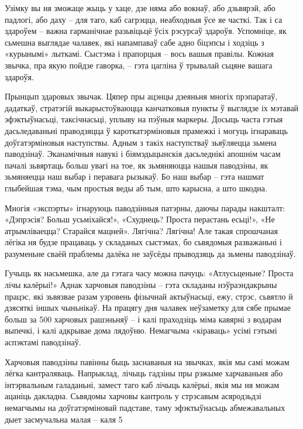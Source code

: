 Узімку вы ня зможаце жыць у хаце, дзе няма або вокнаў, або дзьвярэй, або падлогі, або даху – для таго, каб сагрэцца, неабходныя ўсе яе часткі. Так і са здароўем – важна гарманічнае разьвіцьцё ўсіх рэсурсаў здароўя. Успомніце, як сьмешна выглядае чалавек, які напампаваў сабе адно біцэпсы і ходзіць з «курынымі» лыткамі. Сыстэма і прапорцыя – вось вашыя правілы. Кожная звычка, пра якую пойдзе гаворка, – гэта цагліна ў трывалай сьцяне вашага здароўя.

Прынцып здаровых звычак. Цяпер пры ацэнцы дзеяньня многіх прэпаратаў, дадаткаў, стратэгій выкарыстоўваюцца канчатковыя пункты ў выглядзе іх мэтавай эфэктыўнасьці, таксічнасьці, уплыву на пэўныя маркеры. Досыць часта гэтыя дасьледаваньні праводзяцца ў кароткатэрміновыя прамежкі і могуць ігнараваць доўгатэрміновыя наступствы. Адным з такіх наступстваў зьяўляецца зьмена паводзінаў. Эканамічныя навукі і біямэдыцынскія дасьледнікі апошнім часам пачалі зьвяртаць больш увагі на тое, як зьмяняюцца нашыя паводзіны, як зьмяняецца наш выбар і перавага рызыкаў. Бо наш выбар – гэта нашмат глыбейшая тэма, чым простыя веды аб тым, што карысна, а што шкодна.

Многія «экспэрты» ігнаруюць паводзінныя патэрны, даючы парады накшталт: «Дэпрэсія? Больш усьміхайся!», «Схуднець? Проста перастань есьці!», «Не атрымліваецца? Старайся мацней». Лягічна? Лягічна! Але такая спрошчаная лёгіка ня будзе працаваць у складаных сыстэмах, бо сьвядомыя разважаньні і разуменьне сваёй праблемы далёка не заўсёды прыводзяць да зьмены паводзінаў.

Гучыць як насьмешка, але да гэтага часу можна пачуць: «Атлусьценьне? Проста лічы калёрыі!» Аднак харчовыя паводзіны – гэта складаны нэўраэндакрыны працэс, які зьвязвае разам узровень фізычнай актыўнасьці, ежу, стрэс, сьвятло й дзясяткі іншых чыньнікаў. На працягу дня чалавек неўзаметку для сябе прымае больш за 500 харчовых рашэньняў – і калі праходзіць міма кавярні з водарам выпечкі, і калі адкрывае дома лядоўню. Немагчыма «кіраваць» усімі гэтымі аспэктамі паводзінаў.

Харчовыя паводзіны павінны быць заснаваныя на звычках, якія мы самі можам лёгка кантраляваць. Напрыклад, лічыць гадзіны пры рэжыме харчаваньня або інтэрвальным галаданьні, замест таго каб лічыць калёрыі, якія мы ня можам ацаніць дакладна. Сьвядомы харчовы кантроль у стрэсавым асяродзьдзі немагчымы на доўгатэрміновай падставе, таму эфэктыўнасьць абмежавальных дыет засмучальна малая – каля 5%


